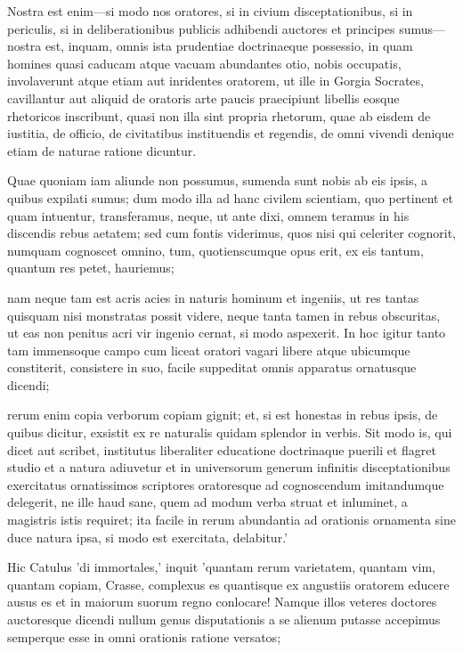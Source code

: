  Nostra est enim—si modo nos oratores, si in civium disceptationibus, si in periculis, si in deliberationibus publicis adhibendi auctores et principes sumus—nostra est, inquam, omnis ista prudentiae doctrinaeque possessio, in quam homines quasi caducam atque vacuam abundantes otio, nobis occupatis, involaverunt atque etiam aut inridentes oratorem, ut ille in Gorgia Socrates, cavillantur aut aliquid de oratoris arte paucis praecipiunt libellis eosque rhetoricos inscribunt, quasi non illa sint propria rhetorum, quae ab eisdem de iustitia, de officio, de civitatibus instituendis et regendis, de omni vivendi denique etiam de naturae ratione dicuntur.

 Quae quoniam iam aliunde non possumus, sumenda sunt nobis ab eis ipsis, a quibus expilati sumus; dum modo illa ad hanc civilem scientiam, quo pertinent et quam intuentur, transferamus, neque, ut ante dixi, omnem teramus in his discendis rebus aetatem; sed cum fontis viderimus, quos nisi qui celeriter cognorit, numquam cognoscet omnino, tum, quotienscumque opus erit, ex eis tantum, quantum res petet, hauriemus;

 nam neque tam est acris acies in naturis hominum et ingeniis, ut res tantas quisquam nisi monstratas possit videre, neque tanta tamen in rebus obscuritas, ut eas non penitus acri vir ingenio cernat, si modo aspexerit. In hoc igitur tanto tam immensoque campo cum liceat oratori vagari libere atque ubicumque constiterit, consistere in suo, facile suppeditat omnis apparatus ornatusque dicendi;

 rerum enim copia verborum copiam gignit; et, si est honestas in rebus ipsis, de quibus dicitur, exsistit ex re naturalis quidam splendor in verbis. Sit modo is, qui dicet aut scribet, institutus liberaliter educatione doctrinaque puerili et flagret studio et a natura adiuvetur et in universorum generum infinitis disceptationibus exercitatus ornatissimos scriptores oratoresque ad cognoscendum imitandumque delegerit, ne ille haud sane, quem ad modum verba struat et inluminet, a magistris istis requiret; ita facile in rerum abundantia ad orationis ornamenta sine duce natura ipsa, si modo est exercitata, delabitur.'

 Hic Catulus 'di immortales,' inquit 'quantam rerum varietatem, quantam vim, quantam copiam, Crasse, complexus es quantisque ex angustiis oratorem educere ausus es et in maiorum suorum regno conlocare! Namque illos veteres doctores auctoresque dicendi nullum genus disputationis a se alienum putasse accepimus semperque esse in omni orationis ratione versatos;

